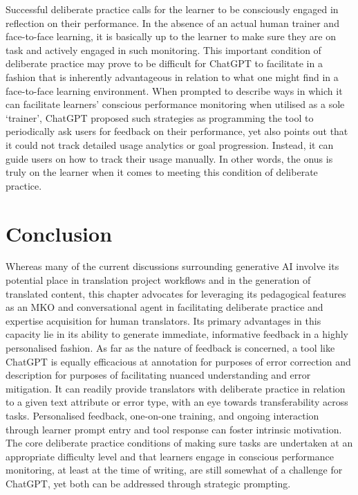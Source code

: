 \documentclass[output=paper]{langscibook}
\begin{document}
Successful deliberate practice calls for the learner to be consciously engaged in reflection on their performance. In the absence of an actual human trainer and face-to-face learning, it is basically up to the learner to make sure they are on task and actively engaged in such monitoring. This important condition of deliberate practice may prove to be difficult for ChatGPT to facilitate in a fashion that is inherently advantageous in relation to what one might find in a face-to-face learning environment. When prompted to describe ways in which it can facilitate learners’ conscious performance monitoring when utilised as a sole ‘trainer’, ChatGPT proposed such strategies as programming the tool to periodically ask users for feedback on their performance, yet also points out that it could not track detailed usage analytics or goal progression. Instead, it can guide users on how to track their usage manually. In other words, the onus is truly on the learner when it comes to meeting this condition of deliberate practice.

\section{Conclusion}\label{sec:2:8}

Whereas many of the current discussions surrounding generative AI involve its potential place in translation project workflows and in the generation of translated content, this chapter advocates for leveraging its pedagogical features as an MKO and conversational agent in facilitating deliberate practice and expertise acquisition for human translators. Its primary advantages in this capacity lie in its ability to generate immediate, informative feedback in a highly personalised fashion. As far as the nature of feedback is concerned, a tool like ChatGPT is equally efficacious at annotation for purposes of error correction and description for purposes of facilitating nuanced understanding and error mitigation. It can readily provide translators with deliberate practice in relation to a given text attribute or error type, with an eye towards transferability across tasks. Personalised feedback, one-on-one training, and ongoing interaction through learner prompt entry and tool response can foster intrinsic motivation. The core deliberate practice conditions of making sure tasks are undertaken at an appropriate difficulty level and that learners engage in conscious performance monitoring, at least at the time of writing, are still somewhat of a challenge for ChatGPT, yet both can be addressed through strategic prompting.
\end{document}
